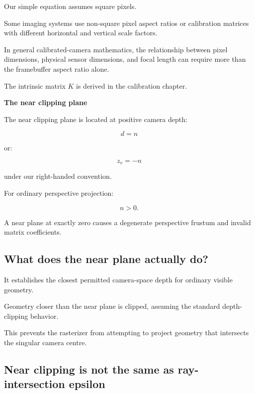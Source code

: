 \hypertarget{02-foundations-ii-ch033-pixel-aspect-ratio}{}

Our simple equation assumes square pixels.

Some imaging systems use non-square pixel aspect ratios or calibration matrices with different horizontal and vertical scale factors.

In general calibrated-camera mathematics, the relationship between pixel dimensions, physical sensor dimensions, and focal length can require more than the framebuffer aspect ratio alone.

The intrinsic matrix \(K\) is derived in the calibration chapter.

\textbf{The near clipping plane}

The near clipping plane is located at positive camera depth:

\[
 \boxed{d=n}
\]

or:

\[
 z_v=-n
\]

under our right-handed convention.

For ordinary perspective projection:

\[
 \boxed{n>0}.
\]

A near plane at exactly zero causes a degenerate perspective frustum and invalid matrix coefficients.

\subsection{What does the near plane actually do?}\label{02-foundations-ii-ch033-what-does-the-near-plane-actually-do}

\hypertarget{02-foundations-ii-ch033-what-does-the-near-plane-actually-do}{}

It establishes the closest permitted camera-space depth for ordinary visible geometry.

Geometry closer than the near plane is clipped, assuming the standard depth-clipping behavior.

This prevents the rasterizer from attempting to project geometry that intersects the singular camera centre.

\subsection{Near clipping is not the same as ray-intersection epsilon}\label{02-foundations-ii-ch033-near-clipping-is-not-the-same-as-ray-intersection-epsilon}

